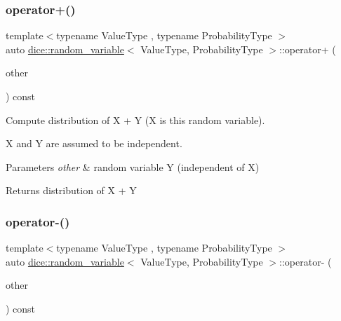 \subsubsection{\texorpdfstring{operator+()}{operator+()}}
{\footnotesize\ttfamily template$<$typename Value\+Type , typename Probability\+Type $>$ \\
auto \mbox{\hyperlink{classdice_1_1random__variable}{dice\+::random\+\_\+variable}}$<$ Value\+Type, Probability\+Type $>$\+::operator+ (\begin{DoxyParamCaption}\item[{const \mbox{\hyperlink{classdice_1_1random__variable}{random\+\_\+variable}}$<$ Value\+Type, Probability\+Type $>$ \&}]{other }\end{DoxyParamCaption}) const\hspace{0.3cm}{\ttfamily [inline]}}



Compute distribution of X + Y (X is this random variable). 

X and Y are assumed to be independent.


\begin{DoxyParams}{Parameters}
{\em other} & random variable Y (independent of X)\\
\hline
\end{DoxyParams}
\begin{DoxyReturn}{Returns}
distribution of X + Y 
\end{DoxyReturn}
\mbox{\label{classdice_1_1random__variable_a40ad720c40cb4467dbb2b735512b279c}} 
\subsubsection{\texorpdfstring{operator-\/()}{operator-()}\hspace{0.1cm}{\footnotesize\ttfamily [1/2]}}
{\footnotesize\ttfamily template$<$typename Value\+Type , typename Probability\+Type $>$ \\
auto \mbox{\hyperlink{classdice_1_1random__variable}{dice\+::random\+\_\+variable}}$<$ Value\+Type, Probability\+Type $>$\+::operator-\/ (\begin{DoxyParamCaption}\item[{const \mbox{\hyperlink{classdice_1_1random__variable}{random\+\_\+variable}}$<$ Value\+Type, Probability\+Type $>$ \&}]{other }\end{DoxyParamCaption}) const\hspace{0.3cm}{\ttfamily [inline]}}



